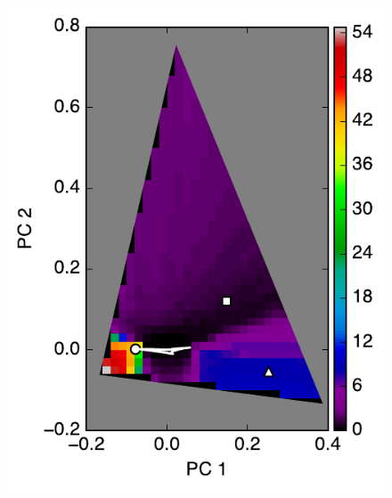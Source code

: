 \documentclass[iop,numberedappendix,apj,]{emulateapj}
\begin{document}
\begin{figure}[tbh!]
   \begin{minipage}{0.33\hsize}
    \begin{center}
\includegraphics[width=\hsize]{mockdata_45deg_3types_t360_lc_noreg.pdf}
    \end{center}
     \end{minipage}   
    \begin{minipage}{0.33\hsize}
    \begin{center}

\end{center}
\end{minipage}
\end{figure}
\end{document}
